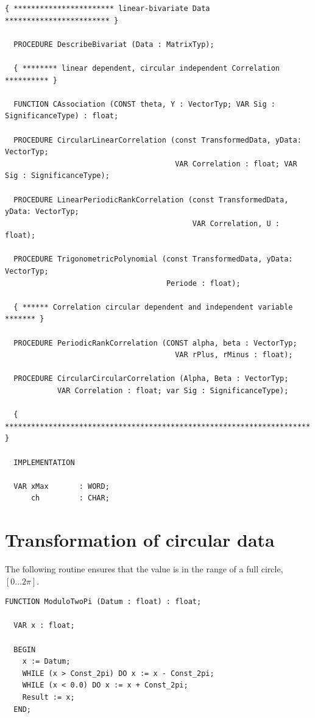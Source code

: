 \begin{refsection}
\begin{lstlisting}[caption=Interface of unit Circular]
  { *********************** linear-bivariate Data ************************ }

  PROCEDURE DescribeBivariat (Data : MatrixTyp);

  { ******** linear dependent, circular independent Correlation ********** }

  FUNCTION CAssociation (CONST theta, Y : VectorTyp; VAR Sig : SignificanceType) : float;

  PROCEDURE CircularLinearCorrelation (const TransformedData, yData: VectorTyp;
                                       VAR Correlation : float; VAR Sig : SignificanceType);

  PROCEDURE LinearPeriodicRankCorrelation (const TransformedData, yData: VectorTyp;
                                           VAR Correlation, U : float);

  PROCEDURE TrigonometricPolynomial (const TransformedData, yData: VectorTyp;
                                     Periode : float);

  { ****** Correlation circular dependent and independent variable ******* }

  PROCEDURE PeriodicRankCorrelation (CONST alpha, beta : VectorTyp;
                                       VAR rPlus, rMinus : float);

  PROCEDURE CircularCircularCorrelation (Alpha, Beta : VectorTyp;
            VAR Correlation : float; var Sig : SignificanceType);

  { ********************************************************************** }

  IMPLEMENTATION

  VAR xMax       : WORD;
      ch         : CHAR;
\end{lstlisting}

\section{Transformation of circular data}

The following routine ensures that the value is in the range of a full circle, \( [0\ldots 2\pi] \).

\begin{lstlisting}[caption=limit datum to  0..2\textpi ]
  FUNCTION ModuloTwoPi (Datum : float) : float;

  VAR x : float;

  BEGIN
    x := Datum;
    WHILE (x > Const_2pi) DO x := x - Const_2pi;
    WHILE (x < 0.0) DO x := x + Const_2pi;
    Result := x;
  END;
\end{lstlisting}


\end{refsection}
